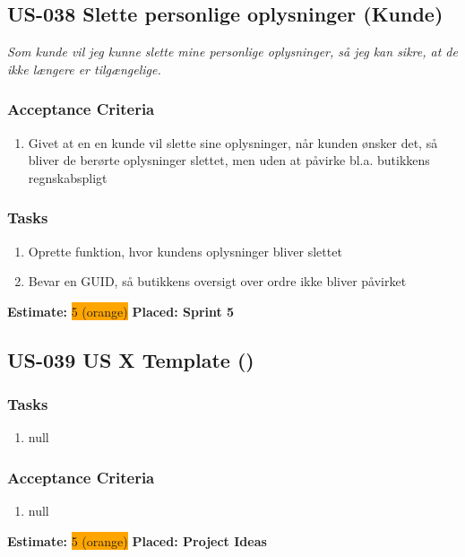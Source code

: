 \subsection{US-038 Slette personlige oplysninger (Kunde)}
\label{sec:US-038}
\textit{Som kunde vil jeg kunne slette mine personlige oplysninger, så jeg kan sikre, at de ikke længere er tilgængelige.}
\subsubsection*{\textbf{Acceptance Criteria}}
\begin{enumerate}
  \item Givet at en en kunde vil slette sine oplysninger, når kunden ønsker det, så bliver de berørte oplysninger slettet, men uden at påvirke bl.a. butikkens regnskabspligt
\end{enumerate}
\subsubsection*{\textbf{Tasks}}
\begin{enumerate}
  \item Oprette funktion, hvor kundens oplysninger bliver slettet
  \item Bevar en GUID, så butikkens oversigt over ordre ikke bliver påvirket
\end{enumerate}
\textbf{Estimate:} \colorbox{orange}{5 (orange)}
\textbf{Placed: Sprint 5}
\par\noindent\dotfill

\subsection{US-039 US X Template ()}
\label{sec:US-039}
\textit{}
\subsubsection*{\textbf{Tasks}}
\begin{enumerate}
  \item null
\end{enumerate}
\subsubsection*{\textbf{Acceptance Criteria}}
\begin{enumerate}
  \item null
\end{enumerate}
\textbf{Estimate:} \colorbox{orange}{5 (orange)}
\textbf{Placed: Project Ideas}
\par\noindent\dotfill

